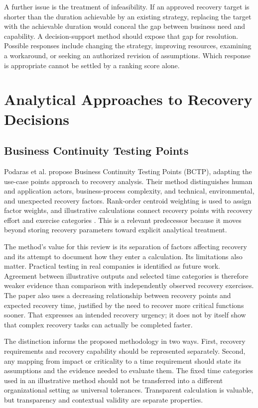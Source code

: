 A further issue is the treatment of infeasibility. If an approved recovery target is shorter than the duration achievable by an existing strategy, replacing the target with the achievable duration would conceal the gap between business need and capability. A decision-support method should expose that gap for resolution. Possible responses include changing the strategy, improving resources, examining a workaround, or seeking an authorized revision of assumptions. Which response is appropriate cannot be settled by a ranking score alone.

\section{Analytical Approaches to Recovery Decisions}

\subsection{Business Continuity Testing Points}

Podaras et al. propose Business Continuity Testing Points (BCTP), adapting the use-case points approach to recovery analysis. Their method distinguishes human and application actors, business-process complexity, and technical, environmental, and unexpected recovery factors. Rank-order centroid weighting is used to assign factor weights, and illustrative calculations connect recovery points with recovery effort and exercise categories \cite{podaras2016tools}. This is a relevant predecessor because it moves beyond storing recovery parameters toward explicit analytical treatment.

The method's value for this review is its separation of factors affecting recovery and its attempt to document how they enter a calculation. Its limitations also matter. Practical testing in real companies is identified as future work. Agreement between illustrative outputs and selected time categories is therefore weaker evidence than comparison with independently observed recovery exercises. The paper also uses a decreasing relationship between recovery points and expected recovery time, justified by the need to recover more critical functions sooner. That expresses an intended recovery urgency; it does not by itself show that complex recovery tasks can actually be completed faster.

The distinction informs the proposed methodology in two ways. First, recovery requirements and recovery capability should be represented separately. Second, any mapping from impact or criticality to a time requirement should state its assumptions and the evidence needed to evaluate them. The fixed time categories used in an illustrative method should not be transferred into a different organizational setting as universal tolerances. Transparent calculation is valuable, but transparency and contextual validity are separate properties.

